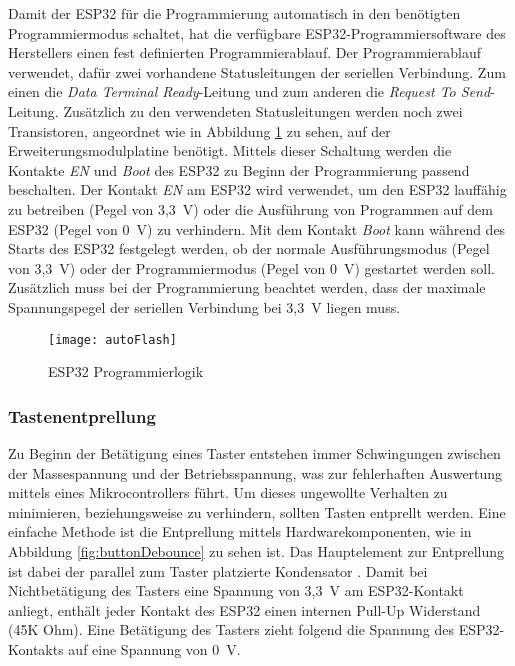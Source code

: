 Damit der ESP32 für die Programmierung automatisch in den benötigten Programmiermodus schaltet, hat die verfügbare ESP32-Programmiersoftware des Herstellers einen fest definierten Programmierablauf.  Der Programmierablauf verwendet, dafür zwei vorhandene Statusleitungen der seriellen Verbindung. Zum einen die \textit{Data Terminal Ready}-Leitung und zum anderen die \textit{Request To Send}-Leitung. Zusätzlich zu den verwendeten Statusleitungen werden noch zwei Transistoren, angeordnet wie in Abbildung \ref{fig:autoFlash} zu sehen, auf der Erweiterungsmodulplatine benötigt. Mittels dieser Schaltung werden die Kontakte \textit{EN} und \textit{Boot} des ESP32 zu Beginn der Programmierung passend beschalten. Der Kontakt \textit{EN} am ESP32 wird verwendet, um den ESP32 lauffähig zu betreiben (Pegel von 3,3~V) oder die Ausführung von Programmen auf dem ESP32 (Pegel von 0~V) zu verhindern. Mit dem Kontakt \textit{Boot} kann während des Starts des ESP32 festgelegt werden, ob der normale Ausführungsmodus (Pegel von 3,3~V) oder der Programmiermodus (Pegel von 0~V) gestartet werden soll. Zusätzlich muss bei der Programmierung beachtet werden, dass der maximale Spannungspegel der seriellen Verbindung bei 3,3~V liegen muss. \cite{espFlashTool}

\begin{figure}[h]
    \centering
    \texttt{[image: autoFlash]}
    \caption{ESP32 Programmierlogik}
    \label{fig:autoFlash}
\end{figure}

\subsubsection{Tastenentprellung}
Zu Beginn der Betätigung eines Taster entstehen immer Schwingungen zwischen der Massespannung und der Betriebsspannung, was zur fehlerhaften Auswertung mittels eines Mikrocontrollers führt. Um dieses ungewollte Verhalten zu minimieren, beziehungsweise zu verhindern, sollten Tasten entprellt werden. Eine einfache Methode ist die Entprellung mittels Hardwarekomponenten, wie in Abbildung \ref{fig:buttonDebounce} zu sehen ist. Das Hauptelement zur Entprellung ist dabei der parallel zum Taster platzierte Kondensator \cite{debounceButton}. Damit bei Nichtbetätigung des Tasters eine Spannung von 3,3~V am ESP32-Kontakt anliegt, enthält jeder Kontakt des ESP32 einen internen Pull-Up Widerstand (45K Ohm). Eine Betätigung des Tasters zieht folgend die Spannung des ESP32-Kontakts auf eine Spannung von 0~V.

